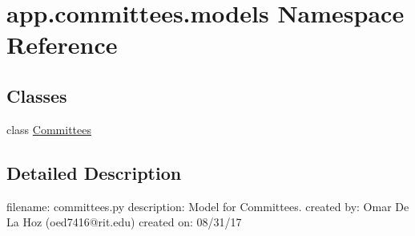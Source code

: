 \hypertarget{namespaceapp_1_1committees_1_1models}{}\section{app.\+committees.\+models Namespace Reference}
\label{namespaceapp_1_1committees_1_1models}
\subsection*{Classes}
\begin{DoxyCompactItemize}
\item 
class \mbox{\hyperlink{classapp_1_1committees_1_1models_1_1_committees}{Committees}}
\end{DoxyCompactItemize}


\subsection{Detailed Description}
\begin{DoxyVerb}filename: committees.py
description: Model for Committees.
created by: Omar De La Hoz (oed7416@rit.edu)
created on: 08/31/17
\end{DoxyVerb}
 